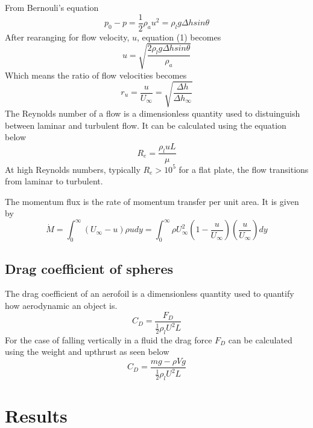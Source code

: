 \documentclass{article}
\begin{document}
From Bernouli's equation
\begin{equation}
    p_0 - p = \frac{1}{2}\rho_a u^2 = \rho_l g \Delta h sin \theta
\end{equation}
After rearanging for flow velocity, $u$, equation (1) becomes
\begin{equation}
    u = \sqrt{ \frac{2 \rho_l g \Delta h sin \theta}{\rho_a} }
\end{equation}
Which means the ratio of flow velocities becomes
\begin{equation}
    r_u = \frac{u}{U_\infty} = \sqrt{\frac{\Delta h}{\Delta h_\infty}}
\end{equation}
The Reynolds number of a flow is a dimensionless quantity used to distuinguish between laminar and turbulent flow.
It can be calculated using the equation below
\begin{equation}
    R_e = \frac{\rho_l u L}{\mu}
\end{equation}
At high Reynolds numbers, typically $R_e > 10^5$ for a flat plate, the flow transitions from laminar to turbulent.

The momentum flux is the rate of momentum transfer per unit area. It is given by
\begin{equation}
    \dot{M} = \int_0^\infty (U_{\infty} - u) \rho u dy = \int_0^\infty \rho U_{\infty}^2 \left( 1 - \frac{u}{U_{\infty}} \right) \left( \frac{u}{U_{\infty}} \right) dy
\end{equation}

\subsection{Drag coefficient of spheres}

The drag coefficient of an aerofoil is a dimensionless quantity used to quantify how aerodynamic an object is.
\begin{equation}
    C_D = \frac{F_D}{\frac{1}{2}\rho_l U^2 L}
\end{equation}
For the case of falling vertically in a fluid the drag force $F_D$ can be calculated using the weight and upthrust as seen below
\begin{equation}
    C_D = \frac{mg - \rho V g}{\frac{1}{2}\rho_l U^2 L}
\end{equation}

\section{Results}
\end{document}
